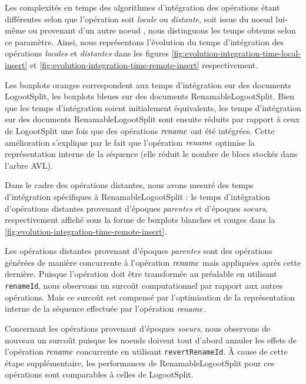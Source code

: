Les complexités en temps des algorithmes d'intégration des opérations étant différentes selon que l'opération soit \emph{locale} ou \emph{distante}, \ie soit issue du noeud lui-même ou provenant d'un autre noeud , nous distinguons les temps obtenus selon ce paramètre.
Ainsi, nous représentons l'évolution du temps d'intégration des opérations \emph{locales} et \emph{distantes} dans les figures \ref{fig:evolution-integration-time-local-insert} et \ref{fig:evolution-integration-time-remote-insert} respectivement.

Les boxplots oranges correspondent aux temps d'intégration sur des documents LogootSplit, les boxplots bleues sur des documents RenamableLogootSplit.
Bien que les temps d'intégration soient initialement équivalents, les temps d'intégration sur des documents RenamableLogootSplit sont ensuite réduits par rapport à ceux de LogootSplit une fois que des opérations $\mathit{rename}$ ont été intégrées.
Cette amélioration s'explique par le fait que l'opération $\mathit{rename}$ optimise la représentation interne de la séquence (\ie elle réduit le nombre de blocs stockés dans l'arbre AVL).

Dans le cadre des opérations distantes, nous avons mesuré des temps d'intégration spécifiques à RenamableLogootSplit : le temps d'intégration d'opérations distantes provenant d'époques \emph{parentes} et d'époques \emph{soeurs}, respectivement affiché sous la forme de boxplots blanches et rouges dans la \autoref{fig:evolution-integration-time-remote-insert}.

Les opérations distantes provenant d'époques \emph{parentes} sont des opérations générées de manière concurrente à l'opération $\mathit{rename}$ mais appliquées après cette dernière.
Puisque l'opération doit être transformée au préalable en utilisant \texttt{renameId}, nous observons un surcoût computationnel par rapport aux autres opérations.
Mais ce surcoût est compensé par l'optimisation de la représentation interne de la séquence effectuée par l'opération $\mathit{rename}$.

Concernant les opérations provenant d'époques \emph{soeurs}, nous observons de nouveau un surcoût puisque les noeuds doivent tout d'abord annuler les effets de l'opération $\mathit{rename}$ concurrente en utilisant \texttt{revertRenameId}.
À cause de cette étape supplémentaire, les performances de RenamableLogootSplit pour ces opérations sont comparables à celles de LogootSplit.

